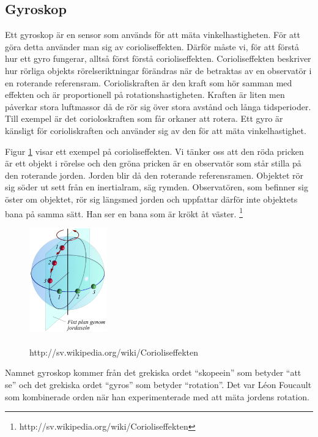 \documentclass[a4paper,12pt,fleqn]{article}
\begin{document}
\subsection{Gyroskop}
Ett gyroskop är en sensor som används för att mäta vinkelhastigheten. För att göra detta använder man sig av corioliseffekten. Därför måste vi, för att förstå hur ett gyro fungerar, alltså först förstå corioliseffekten. Corioliseffekten beskriver hur rörliga objekts rörelseriktningar förändras när de betraktas av en observatör i en roterande referensram. Corioliskraften är den kraft som hör samman med effekten och är proportionell på rotationshastigheten. Kraften är liten men påverkar stora luftmassor då de rör sig över stora avstånd och långa tidsperioder. Till exempel är det corioloskraften som får orkaner att rotera. Ett gyro är känsligt för corioliskraften och använder sig av den för att mäta vinkelhastighet.

Figur \ref{fig:jord} visar ett exempel på corioliseffekten. Vi tänker oss att den röda pricken är ett objekt i rörelse och den gröna pricken är en observatör som står stilla på den roterande jorden. Jorden blir då den roterande referensramen. Objektet rör sig söder ut sett från en inertialram, säg rymden. Observatören, som befinner sig öster om objektet, rör sig längsmed jorden och uppfattar därför inte objektets bana på samma sätt. Han ser en bana som är krökt åt väster.
\footnote{http://sv.wikipedia.org/wiki/Corioliseffekten}


\begin{figure}[h]
\begin{center}
\caption{\\http://sv.wikipedia.org/wiki/Corioliseffekten}
\label{fig:jord}
\includegraphics[width=0.3\textwidth]
{Coriolisjord.png}
\end{center}
\end{figure}

Namnet  gyroskop kommer från det grekiska ordet “skopeein” som betyder “att se” och det grekiska ordet “gyros” som betyder “rotation”. Det var Léon Foucault som kombinerade orden när han experimenterade med att mäta jordens rotation.
\end{document}
